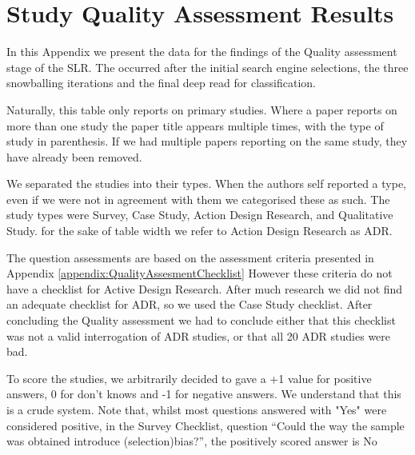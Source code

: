 \chapter{Study Quality Assessment Results} 
\label{appendix:Quality_Assessment_Results} 

In this Appendix we present the data for the findings of the Quality assessment stage of the SLR.
The occurred after the initial search engine selections, the three snowballing iterations and the final deep read for classification.

Naturally, this table only reports on primary studies.
Where a paper reports on more than one study the paper title appears multiple times, with the type of study in parenthesis.
If we had multiple papers reporting on the same study, they have already been removed.

We separated the studies into their types. 
When the authors self reported a type, even if we were not in agreement with them we categorised these as such.
The study types were Survey, Case Study, Action Design Research, and Qualitative Study.
for the sake of table width we refer to Action Design Research as ADR.

The question assessments are based on the assessment criteria presented in Appendix \ref{appendix:QualityAssesmentChecklist}
However these criteria do not have a checklist for Active Design Research.
After much research we did not find an adequate checklist for ADR, so we used the Case Study checklist.
After concluding the Quality assessment we had to conclude either that this checklist was not a valid interrogation of ADR studies, or that all 20 ADR studies were bad.

To score the studies, we arbitrarily decided to gave a +1 value for positive answers, 0 for don't knows and -1 for negative answers.
We understand that this is a crude system.
Note that, whilst most questions answered with "Yes" were considered positive, in the Survey Checklist, question ``Could the way the sample was obtained introduce (selection)bias?'', the positively scored answer is No

